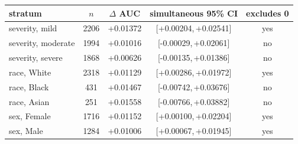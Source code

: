 \begin{tabular}{lcccc}
\toprule
stratum & $n$ & $\Delta$ AUC & simultaneous 95\% CI & excludes 0 \\
\midrule
severity, mild & 2206 & +0.01372 & [+0.00204,\,+0.02541] & yes \\
severity, moderate & 1994 & +0.01016 & [-0.00029,\,+0.02061] & no \\
severity, severe & 1868 & +0.00626 & [-0.00135,\,+0.01386] & no \\
race, White & 2318 & +0.01129 & [+0.00286,\,+0.01972] & yes \\
race, Black & 431 & +0.01467 & [-0.00742,\,+0.03676] & no \\
race, Asian & 251 & +0.01558 & [-0.00766,\,+0.03882] & no \\
sex, Female & 1716 & +0.01152 & [+0.00100,\,+0.02204] & yes \\
sex, Male & 1284 & +0.01006 & [+0.00067,\,+0.01945] & yes \\
\bottomrule
\end{tabular}
